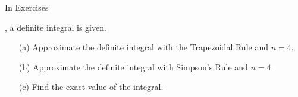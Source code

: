 {\noindent In Exercises}
{, a definite integral is given. 
\begin{enumerate}
\item	[(a)] Approximate the definite integral with the Trapezoidal Rule and $n=4$.
\item	[(b)] Approximate the definite integral with Simpson's Rule and $n=4$.
\item	[(c)] Find the exact value of the integral.
\end{enumerate}
}
